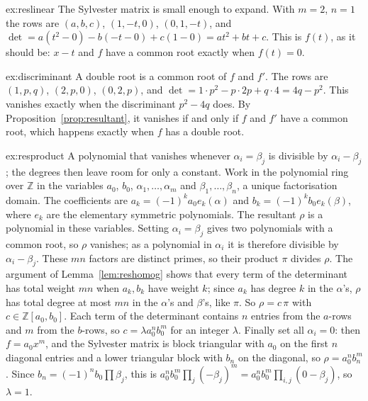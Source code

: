 \begin{solution}{ex:reslinear}
\idea The Sylvester matrix is small enough to expand.
\writeup With $m=2$, $n=1$ the rows are $(a,b,c)$, $(1,-t,0)$, $(0,1,-t)$, and
$\det=a(t^2-0)-b(-t-0)+c(1-0)=at^2+bt+c$. This is $f(t)$, as it should be: $x-t$ and $f$ have a common root exactly when $f(t)=0$.
\end{solution}

\begin{solution}{ex:discriminant}
\idea A double root is a common root of $f$ and $f'$.
\writeup The rows are $(1,p,q)$, $(2,p,0)$, $(0,2,p)$, and $\det=1\cdot p^2-p\cdot2p+q\cdot4=4q-p^2$. This vanishes exactly when the discriminant
$p^2-4q$ does. By Proposition~\ref{prop:resultant}, it vanishes if and only if $f$ and $f'$ have a common root, which happens exactly when $f$ has a double root.
\end{solution}

\begin{solution}{ex:resproduct}
\idea A polynomial that vanishes whenever $\alpha_i=\beta_j$ is divisible by $\alpha_i-\beta_j$; the degrees then leave room for only a constant.
\writeup Work in the polynomial ring over $\mathbb Z$ in the variables $a_0$, $b_0$, $\alpha_1,\dots,\alpha_m$ and $\beta_1,\dots,\beta_n$, a unique factorisation domain. The coefficients are
$a_k=(-1)^ka_0e_k(\alpha)$ and $b_k=(-1)^kb_0e_k(\beta)$, where $e_k$ are the elementary symmetric polynomials. The resultant $\rho$ is a polynomial in these
variables. Setting $\alpha_i=\beta_j$ gives two polynomials with a common root, so $\rho$ vanishes; as a polynomial in $\alpha_i$ it is therefore divisible by
$\alpha_i-\beta_j$. These $mn$ factors are distinct primes, so their product $\pi$ divides $\rho$. The argument of Lemma~\ref{lem:reshomog} shows that every term
of the determinant has total weight $mn$ when $a_k,b_k$ have weight $k$; since $a_k$ has degree $k$ in the $\alpha$'s, $\rho$ has total degree at most $mn$ in the
$\alpha$'s and $\beta$'s, like $\pi$. So $\rho=c\,\pi$ with $c\in\mathbb Z[a_0,b_0]$. Each term of the determinant contains $n$ entries from the $a$-rows and $m$ from the
$b$-rows, so $c=\lambda a_0^nb_0^m$ for an integer $\lambda$. Finally set all $\alpha_i=0$: then $f=a_0x^m$, and the Sylvester matrix is block triangular with
$a_0$ on the first $n$ diagonal entries and a lower triangular block with $b_n$ on the diagonal, so $\rho=a_0^nb_n^m$. Since $b_n=(-1)^nb_0\prod\beta_j$, this is
$a_0^nb_0^m\prod_j(-\beta_j)^m=a_0^nb_0^m\prod_{i,j}(0-\beta_j)$, so $\lambda=1$.
\end{solution}

